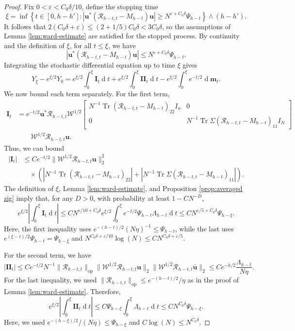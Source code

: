 \documentclass[11pt,reqno]{amsart}
\def\u{\mathbf{u}}
\def\m{\mathbf{m}}
\def\cR{\mathcal{R}}
\def\cW{\mathcal{W}}
\def\de{\operatorname{d}}
\def\op{\mathrm{op}}
\def\eps{\varepsilon}
\def\Tr{\operatorname{Tr}}
\theoremstyle{definition}
\numberwithin{equation}{section}
\numberwithin{figure}{section}
\begin{document}
\begin{proof}
Fix $0<\eps<C_0\delta/10$, define the stopping time
\[
 \xi=\inf\left\{t\in[0,h-h']:
   |\u^*(\cR_{h-t,t}-M_{h-t})\u|\ge N^{\eps+C_0\delta}\Psi_{h-t}\right\}\wedge (h-h').
\]
It follows that $2(C_0\delta+\eps)\leq (2+1/5)C_0\delta<3C_0\delta$, so the assumptions of Lemma \ref{lem:ward-estimate} are satisfied for the stopped process. By continuity and the definition of $\xi$, for all $t\leq\xi$, we have
\[
    |\u^*(\cR_{h-t,t}-M_{h-t})\u|\leq N^{\eps+C_0\delta}\Psi_{h-t}.
\]
Integrating the stochastic differential equation up to time $\xi$ gives
\[
    Y_\xi-e^{\xi/2}Y_0=e^{\xi/2}\int_0^\xi\mathbf{I}_t\de t
    +e^{\xi/2}\int_0^\xi\mathbf{II}_t\de t
    -e^{\xi/2}\int_0^\xi e^{-t/2}\de\m_t.
\]
We now bound each term separately. For the first term,
\[
\begin{aligned}
    \mathbf{I}_t
    &=e^{-t/2}\u^*\cR_{h-t,t}\cW^{1/2}
      \begin{bmatrix}
        N^{-1}\Tr(\cR_{h-t,t}-M_{h-t})_{22}I_n &0\\
        0& N^{-1}\Tr\Sigma(\cR_{h-t,t}-M_{h-t})_{11}I_N
      \end{bmatrix}\\
    &\qquad{}\cW^{1/2}\cR_{h-t,t}\u.
\end{aligned}
\]
Thus, we can bound
\begin{align*}
    |\mathbf{I}_t|
    &\leq Ce^{-t/2}\|\cW^{1/2}\cR_{h-t,t}\u\|_2^2\\
    &\quad\times (|N^{-1}\Tr(\cR_{h-t,t}-M_{h-t})_{22}|
    +|N^{-1}\Tr\Sigma(\cR_{h-t,t}-M_{h-t})_{11}|).
\end{align*}
The definition of $\xi$, Lemma \ref{lem:ward-estimate}, and Proposition \ref{prop:averaged zig} imply that, for any $D>0$,
with probability at least $1-CN^{-D}$,
\[
    e^{\xi/2}\left|\int_0^{\xi}\mathbf{I}_t\de t\right|
    \leq CN^{\eps/10+C_0\delta}e^{\xi/2}\int_0^\xi e^{-t/2}\Psi_{h-t}\Lambda_{h-t}\de t
    \leq CN^{\eps/5+C_0\delta}\Psi_{h-\xi}.
\]
Here, the first inequality uses $e^{-(h-t)/2}(N\eta)^{-1}\leq \Psi_{h-t}$, while the last uses $e^{(\xi-t)/2}\Psi_{h-t}=\Psi_{h-\xi}$
and $N^{C_0\delta+\eps/10}\log(N)\leq CN^{C_0\delta+\eps/5}$.

For the second term, we have
\[
    |\mathbf{II}_t|\leq Ce^{-t/2}N^{-1}\|\cR_{h-t,t}\|_\op
    \|\cW^{1/2}\cR_{h-t,t}\u\|_2\|\cW^{1/2}\cR_{h-t,t}\bar{\u}\|_2
    \leq Ce^{-h/2}\frac{\Lambda_{h-t}}{N\eta}.
\]
For the last inequality, we used
$\|\cR_{h-t,t}\|_\op\leq e^{-(h-t)/2}/\eta$ as in the proof of Lemma 
\ref{lem:ward-estimate}. Therefore,
\[
    e^{\xi/2}\left|\int_0^\xi\mathbf{II}_t\de t\right|
    \leq C\Psi_{h-\xi}\int_0^\xi\Lambda_{h-t}\de t
    \leq CN^{C_0\delta}\Psi_{h-\xi}. 
\]
Here, we used $e^{-(h-\xi)/2}/(N\eta)\leq\Psi_{h-\xi}$
and $C\log(N)\leq N^{C_0\delta}$.


\end{proof}
\end{document}
